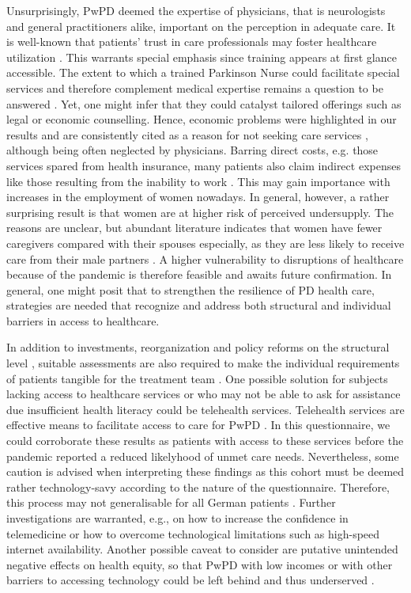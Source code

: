 \documentclass[a4paper,oneside,11pt,english]{scrartcl}
\begin{document}
Unsurprisingly, Pw\textsc{PD} deemed the expertise of physicians, that is neurologists and general practitioners alike, important on the perception in adequate care. It is well-known that patients' trust in care professionals may foster healthcare utilization \cite{bainbridge2009challenges, shin2016initiation}. This warrants special emphasis since training appears at first glance accessible. The extent to which a trained Parkinson Nurse could facilitate special services and therefore complement medical expertise remains a question to be answered \cite{vanrole}. Yet, one might infer that they could catalyst tailored offerings such as legal or economic counselling. Hence, economic problems were highlighted in our results and are consistently cited as a reason for not seeking care services \cite{zaman2021barriers}, although being often neglected by physicians. Barring direct costs, e.g. those services spared from health insurance, many patients also claim indirect expenses like those resulting from the inability to work \cite{spottke2005cost}. This may gain importance with increases in the employment of women nowadays.  In general, however, a rather surprising result is that women are at higher risk of perceived undersupply. The reasons are unclear, but abundant literature indicates that women have fewer caregivers compared with their spouses \cite{dahodwala2018sex} especially, as they are less likely to receive care from their male partners \cite{zaman2021barriers}. A higher vulnerability to disruptions of healthcare because of the pandemic is therefore feasible and awaits future confirmation. In general, one might posit that to strengthen the resilience of \textsc{PD} health care, strategies are needed that recognize and address both structural and individual barriers in access to healthcare.

In addition to investments, reorganization and policy reforms on the structural level \cite{taylor2016leveraging, gottlieb2019social}, suitable assessments are also required to make the individual requirements of patients tangible for the treatment team \cite{friedman2018toward, gottlieb2019social}. One possible solution for subjects lacking access to healthcare services or who may not be able to ask for assistance due insufficient health literacy could be telehealth services. Telehealth services are effective means to facilitate access to care for Pw\textsc{PD} \cite{achey2014past, van2021moving}. In this questionnaire, we could corroborate these results as patients with access to these services before the pandemic reported a reduced likelyhood of unmet care needs. Nevertheless, some caution is advised when interpreting these findings as this cohort must be deemed rather technology-savy according to the nature of the questionnaire. Therefore, this process may not generalisable for all German patients \cite{eggers2020care}. Further investigations are warranted, e.g., on how to increase the confidence in telemedicine or how to overcome technological limitations such as high-speed internet availability. Another possible caveat to consider are putative unintended negative effects on health equity, so that Pw\textsc{PD} with low incomes or with other barriers to accessing technology could be left behind and thus underserved \cite{samuels2021digital}. 
\end{document}
